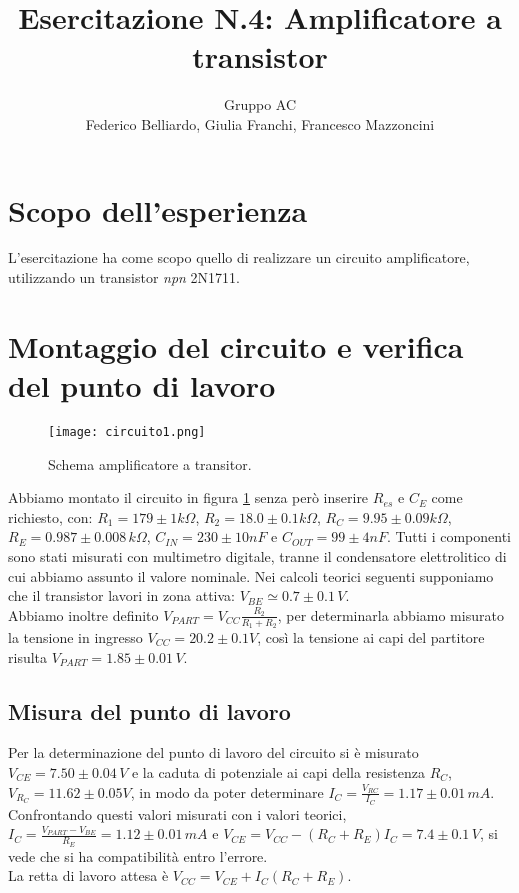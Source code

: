 \documentclass[10pt,a4paper]{article}
\author{Gruppo AC \\ Federico Belliardo, Giulia Franchi, Francesco Mazzoncini}
\title{Esercitazione N.4: Amplificatore a transistor}
\begin{document}
\maketitle

\section{Scopo dell'esperienza}
L'esercitazione ha come scopo quello di realizzare un circuito amplificatore, utilizzando un transistor \textit{npn} 2N1711.

\section{Montaggio del circuito e verifica del punto di lavoro}

\begin{figure}[!htb]
  \centering
  \texttt{[image: circuito1.png]}
\caption{Schema amplificatore a transitor.}
\label{circuito}
\end{figure}

Abbiamo montato il circuito in figura \ref{circuito} senza però inserire $R_{es}$ e $C_E$ come richiesto, con: $R_1= 179\pm1  k\Omega$, $R_2= 18.0\pm0.1  k\Omega$, $R_C= 9.95\pm 0.09  k\Omega$, $R_E= 0.987\pm 0.008 \, k\Omega$, $C_{IN}= 230\pm10  nF$ e $C_{OUT}= 99\pm4  nF$. Tutti i componenti sono stati misurati con multimetro digitale, tranne il condensatore elettrolitico di cui abbiamo assunto il valore nominale. Nei calcoli teorici seguenti supponiamo che il transistor lavori in zona attiva: $V_{BE} \simeq 0.7 \pm 0.1 \, V$.\\ 
Abbiamo inoltre definito $V_{PART}=V_{CC}\frac{R_2}{R_1+R_2}$, per determinarla abbiamo misurato la tensione in ingresso $V_{CC}= 20.2\pm0.1 V$, così la tensione ai capi del partitore risulta $V_{PART}=1.85 \pm 0.01\,V$.


\subsection{Misura del punto di lavoro}
Per la determinazione del punto di lavoro del circuito si è misurato $V_{CE}= 7.50\pm0.04 \, V$ e la caduta di potenziale ai capi della resistenza $R_C$, $V_{R_C}= 11.62\pm0.05  V$, in modo da poter determinare $I_C=\frac{V_{RC}}{I_C} = 1.17\pm0.01\,mA$.
Confrontando questi valori misurati con i valori teorici, $I_C=\frac{V_{PART}-V_{BE}}{R_E}= 1.12\pm0.01\,mA$ e $V_{CE}=V_{CC}-(R_C+R_E)I_C= 7.4\pm0.1\,V$, si vede che si ha compatibilità entro l'errore.\\
La retta di lavoro attesa è  $V_{CC}=V_{CE}+I_C(R_C+R_E)$.
\end{document}
